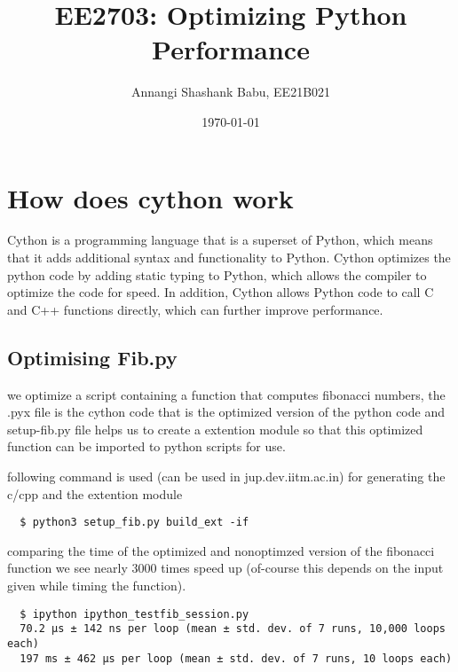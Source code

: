 \documentclass[titlepage, 11pt]{article}
\begin{document}
 
\title{
    {EE2703: Optimizing Python Performance}
}
\author{Annangi Shashank Babu, EE21B021}
\date{\today}     
\maketitle
\setcounter{page}{0}
\tableofcontents
\newpage

\section{How does cython work}

\begin{flushleft}
Cython is a programming language that is a superset of Python, which means that it adds additional syntax and functionality to Python.
Cython optimizes the python code by adding static typing to Python, which allows the compiler to optimize the code for speed. In addition, Cython allows Python code to call C and C++ functions directly, which can further improve performance.
\end{flushleft}
\subsection{Optimising Fib.py}
\begin{flushleft}
we optimize a script containing a function that computes fibonacci
numbers, the .pyx file is the cython code that is the optimized version
of the python code and setup-fib.py file helps us to create a 
extention module so that this optimized function can be imported
to python scripts for use.
\end{flushleft}




following command is used (can be used in jup.dev.iitm.ac.in) for generating the c/cpp and the extention
module 
\begin{verbatim}
  $ python3 setup_fib.py build_ext -if 
\end{verbatim}
comparing the time of the optimized and nonoptimzed version of 
the fibonacci function we see nearly 3000 times speed up (of-course this
depends on the input given while timing the function).

\begin{verbatim}
  $ ipython ipython_testfib_session.py 
  70.2 µs ± 142 ns per loop (mean ± std. dev. of 7 runs, 10,000 loops each)
  197 ms ± 462 µs per loop (mean ± std. dev. of 7 runs, 10 loops each)
\end{verbatim}
\end{document}
